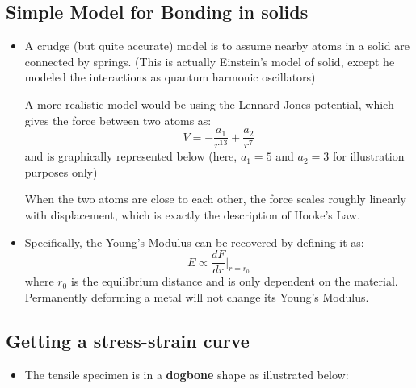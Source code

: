 \subsection{Simple Model for Bonding in solids}
\begin{itemize}
    \item A crudge (but quite accurate) model is to assume nearby atoms in a solid are connected by springs. (This is actually Einstein's model of solid, except he modeled the interactions as quantum harmonic oscillators)
    \begin{idea}
        A more realistic model would be using the Lennard-Jones potential, which gives the force between two atoms as:
        \begin{equation}
            V = -\frac{a_1}{r^{13}}+\frac{a_2}{r^7}
        \end{equation}
        and is graphically represented below (here, $a_1=5$ and $a_2=3$ for illustration purposes only)
        \begin{center}
        \end{center}
    \end{idea}
    When the two atoms are close to each other, the force scales roughly linearly with displacement, which is exactly the description of Hooke's Law.
    \item Specifically, the Young's Modulus can be recovered by defining it as:
    \begin{equation}
        E \propto \frac{dF}{dr} \Big|_{r=r_0}
    \end{equation}
    where $r_0$ is the equilibrium distance and is only dependent on the material. Permanently deforming a metal will not change its Young's Modulus.
\end{itemize}
\subsection{Getting a stress-strain curve}
\begin{itemize}
    \item The tensile specimen is in a \textbf{dogbone} shape as illustrated below:
    \begin{figure}[h]
        \centering
    \end{figure}
\end{itemize}

